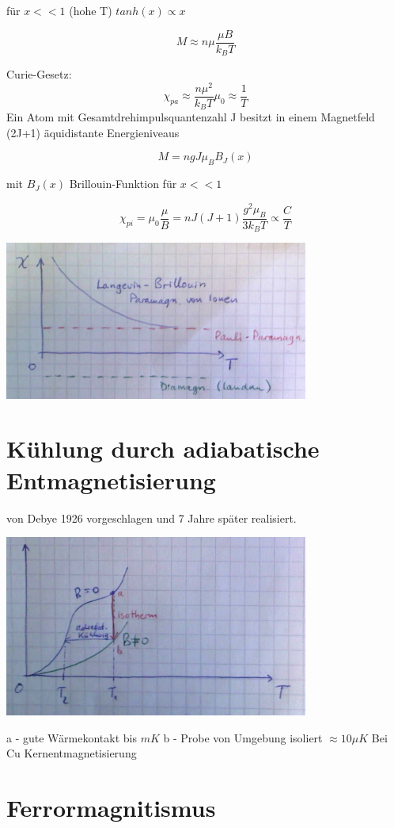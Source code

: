 für \(x<<1\) (hohe T) \(tanh(x)\propto x\)

\[M\approx n\mu \frac{\mu B}{k_B T}\]

Curie-Gesetz:
\[\chi_{pa}\approx \frac{n\mu^2}{k_BT}\mu_0\approx \frac{1}{T}\]
Ein Atom mit Gesamtdrehimpulsquantenzahl J besitzt in einem Magnetfeld (2J+1) äquidistante Energieniveaus

\[M = ngJ\mu_B B_J(x)\]

mit \( B_J(x) \) Brillouin-Funktion für \(x<<1\)

\[\chi_{pi} = \mu_0\frac{\mu}{B} = n J(J+1)\frac{g^2\mu_B}{3k_BT}\propto\frac{C}{T}\]

\includegraphics[width=0.75\textwidth]{kap12_07.png}

\section{Kühlung durch adiabatische Entmagnetisierung}

von Debye 1926 vorgeschlagen und 7 Jahre später realisiert.

\includegraphics[width=0.75\textwidth]{kap12_08.png}

a - gute Wärmekontakt bis \(mK\)
b - Probe von Umgebung isoliert \(\approx 10 \mu K\) Bei Cu Kernentmagnetisierung



\section{Ferrormagnitismus}


